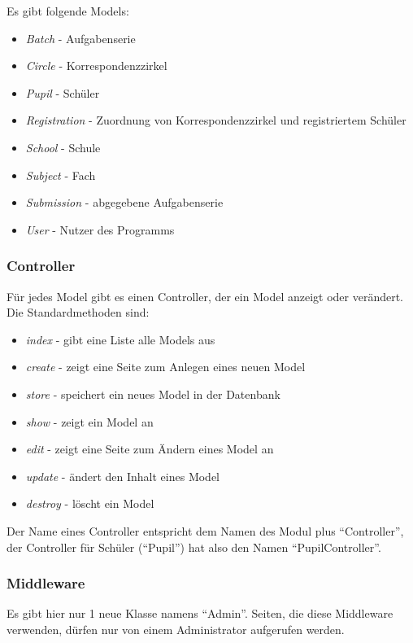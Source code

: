 Es gibt folgende Models:

\begin{itemize}
	\item \textit{Batch} - Aufgabenserie
	\item \textit{Circle} - Korrespondenzzirkel
	\item \textit{Pupil} - Schüler
	\item \textit{Registration} - Zuordnung von Korrespondenzzirkel und registriertem Schüler
	\item \textit{School} - Schule
	\item \textit{Subject} - Fach
	\item \textit{Submission} - abgegebene Aufgabenserie
	\item \textit{User} - Nutzer des Programms
\end{itemize}

\subsubsection{Controller}

Für jedes Model gibt es einen Controller, der ein Model anzeigt oder verändert. Die Standardmethoden sind:

\begin{itemize}
	\item \textit{index} - gibt eine Liste alle Models aus
	\item \textit{create} - zeigt eine Seite zum Anlegen eines neuen Model
	\item \textit{store} - speichert ein neues Model in der Datenbank
	\item \textit{show} - zeigt ein Model an
	\item \textit{edit} - zeigt eine Seite zum Ändern eines Model an
	\item \textit{update} - ändert den Inhalt eines Model
	\item \textit{destroy} - löscht ein Model
\end{itemize}

Der Name eines Controller entspricht dem Namen des Modul plus "`Controller"', der Controller für Schüler ("`Pupil"') hat also den Namen "`PupilController"'.

\subsubsection{Middleware}

Es gibt hier nur 1 neue Klasse namens "`Admin"'. Seiten, die diese Middleware verwenden, dürfen nur von einem Administrator aufgerufen werden.

